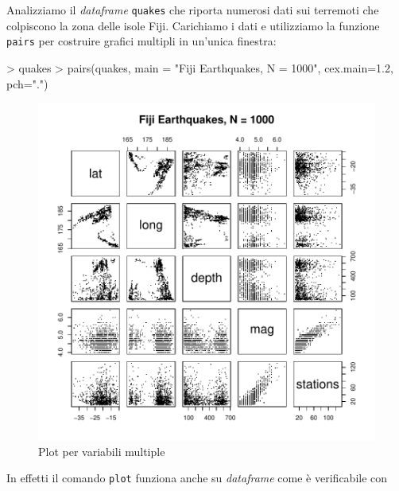 \documentclass[onecolumn,11pt]{book}
\begin{document}
Analizziamo il {\it dataframe} \texttt{quakes} che riporta numerosi dati sui terremoti che colpiscono la zona delle isole Fiji. 
Carichiamo i dati e utilizziamo la funzione \texttt{pairs} per costruire grafici multipli in un'unica finestra:
\begin{Schunk}
\begin{Sinput}
> quakes
> pairs(quakes, main = "Fiji Earthquakes, N = 1000", cex.main=1.2, pch=".")
\end{Sinput}
\end{Schunk}

\begin{center}
\begin{figure}
\includegraphics{statisticaconR-347}
\caption{Plot per variabili multiple}
\label{pairplot}
\end{figure}
\end{center}
In effetti il comando \texttt{plot} funziona anche su \emph{dataframe} come \`e verificabile con 
\end{document}
